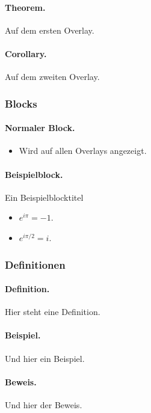 \documentclass[12pt,ngerman]{scrartcl}
\begin{document}
\paragraph{Theorem.} Auf dem ersten Overlay.

\paragraph{Corollary.} Auf dem zweiten Overlay.

\subsubsection*{Blocks}

\paragraph{Normaler Block.}
\begin{itemize}
\item Wird auf allen Overlays angezeigt.
\end{itemize}

\paragraph{Beispielblock.}
Ein Beispielblocktitel

\begin{itemize}
\item $e^{i\pi}=-1$.
\item $e^{i\pi/2}=i$.
\end{itemize}

\subsubsection*{Definitionen}

\paragraph{Definition.} Hier steht eine Definition.

\paragraph{Beispiel.} Und hier ein Beispiel.

\paragraph{Beweis.} Und hier der Beweis.
\end{document}
